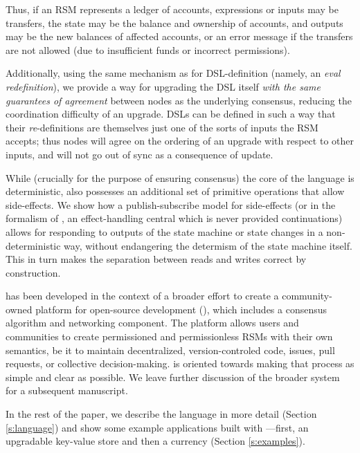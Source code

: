 Thus, if an RSM represents a ledger of accounts, expressions or inputs may be transfers, the
state may be the balance and ownership of accounts, and outputs may be the new
balances of affected accounts, or an error message if the transfers are not
allowed (due to insufficient funds or incorrect permissions).

Additionally, using the same mechanism as for DSL-definition (namely, an
\emph{eval redefinition}), we provide a way for upgrading the DSL itself
\emph{with the same guarantees of agreement} between nodes as the underlying
consensus, reducing the coordination difficulty of an upgrade. DSLs can be
defined in such a way that their \emph{re}-definitions are themselves just one of the
sorts of inputs the RSM accepts; thus nodes will agree on the ordering of an
upgrade with respect to other inputs, and will not go out of sync as a
consequence of update.

While (crucially for the purpose of ensuring consensus) the core of the language
is deterministic, \rad{} also possesses an additional set of primitive operations
that allow side-effects. We show how a publish-subscribe model for side-effects
(or in the formalism of \cite{Cartwright1994}, an effect-handling central which
is never provided continuations) allows for responding to outputs of the state
machine or state changes in a non-deterministic way, without endangering the
determism of the state machine itself. This in turn makes the separation between
reads and writes correct by construction.

\rad{} has been developed in the context of a broader effort to create a
community-owned platform for open-source development (\oscoin{}), which
includes a consensus algorithm and networking component. The \oscoin{}
platform allows users and communities to create permissioned and permissionless
RSMs with their own semantics, be it to maintain decentralized,
version-controled code, issues, pull requests, or collective decision-making.
\rad{} is
oriented towards making that process as simple and clear as possible. We leave further
discussion of the broader \oscoin{} system for a subsequent manuscript.

In the rest of the paper, we describe the language in more detail (Section
\ref{s:language}) and show some example applications built with \rad{}---first,
an upgradable key-value store and then a currency
(Section \ref{s:examples}).

